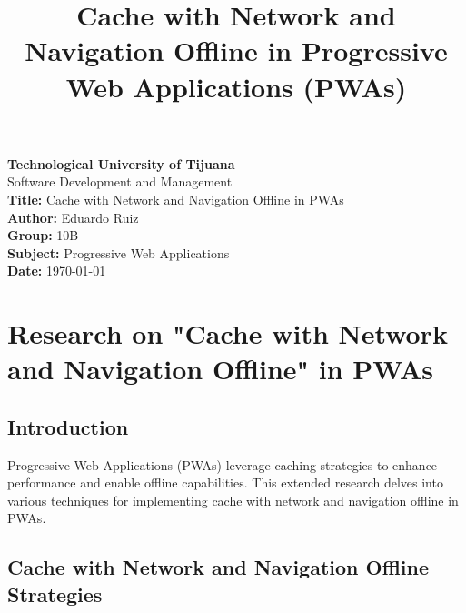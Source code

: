 \documentclass[12pt, a4paper, twoside]{article}
\date{}
\begin{document}
\title{Cache with Network and Navigation Offline in Progressive Web Applications (PWAs)}

\maketitle

\begin{center}
\Large \textbf{Technological University of Tijuana} \\
\large Software Development and Management \\
\vspace{1cm}
\Large \textbf{Title:} Cache with Network and Navigation Offline in PWAs \\
\vspace{1cm}
\large \textbf{Author:} Eduardo Ruiz \\
\large \textbf{Group:} 10B \\
\large \textbf{Subject:} Progressive Web Applications \\
\vspace{1.5cm}
\large \textbf{Date:} \today
\end{center}

\newpage
\tableofcontents

\newpage

\section{Research on "Cache with Network and Navigation Offline" in PWAs}
\label{sec:research}

\subsection{Introduction}
Progressive Web Applications (PWAs) leverage caching strategies to enhance performance and enable offline capabilities. This extended research delves into various techniques for implementing cache with network and navigation offline in PWAs.

\subsection{Cache with Network and Navigation Offline Strategies}
\end{document}

